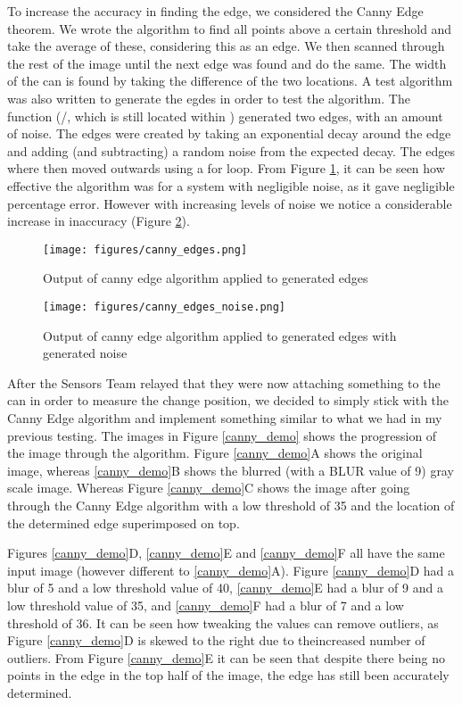 To increase the accuracy in finding the edge, we considered the Canny Edge theorem.  We wrote the algorithm to find all points above a certain threshold and take the average of these, considering this as an edge.  We then scanned through the rest of the image until the next edge was found and do the same.  The width of the can is found by taking the difference of the two locations. A test algorithm was also written to generate the egdes in order to test the algorithm.  The function (/, which is still located within ) generated two edges, with an amount of noise.  The edges were created by taking an exponential decay around the edge and adding (and subtracting) a random noise from the expected decay.  The edges where then moved outwards using a for loop. From Figure \ref{canny_edges.png}, it can be seen how effective the algorithm was for a system with negligible noise, as it gave negligible percentage error.  However with increasing levels of noise we notice a considerable increase in inaccuracy (Figure \ref{canny_edges_noise.png}).  



\begin{figure}[H]
	\centering
	\texttt{[image: figures/canny\_edges.png]}
	\caption{Output of canny edge algorithm applied to generated edges} 
	\label{canny_edges.png}
\end{figure}

\begin{figure}[H]
	\centering
	\texttt{[image: figures/canny\_edges\_noise.png]}
	\caption{Output of canny edge algorithm applied to generated edges with generated noise} 
	\label{canny_edges_noise.png}
\end{figure}

After the Sensors Team relayed that they were now attaching something to the can in order to measure the change position, we decided to simply stick with the Canny Edge algorithm and implement something similar to what we had in my previous testing.  The images in Figure \ref{canny_demo} shows the progression of the image through the algorithm. Figure \ref{canny_demo}A shows the original image, whereas \ref{canny_demo}B shows the blurred (with a BLUR value of 9) gray scale image.  Whereas Figure \ref{canny_demo}C shows the image after going through the Canny Edge algorithm with a low threshold of 35 and the location of the determined edge superimposed on top.    

Figures \ref{canny_demo}D, \ref{canny_demo}E and \ref{canny_demo}F all have the same input image (however different to \ref{canny_demo}A).  Figure \ref{canny_demo}D had a blur of 5 and a low threshold value of 40, \ref{canny_demo}E had a blur of 9 and a low threshold value of 35, and \ref{canny_demo}F had a blur of 7 and a low threshold of 36.  It can be seen how tweaking the values can remove outliers, as Figure \ref{canny_demo}D is skewed to the right due to theincreased number of outliers.  From Figure \ref{canny_demo}E it can be seen that despite there being no points in the edge in the top half of the image, the edge has still been accurately determined.  

